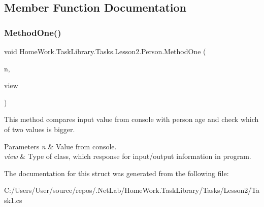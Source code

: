 \subsection{Member Function Documentation}
\mbox{\label{struct_home_work_1_1_task_library_1_1_tasks_1_1_lesson2_1_1_person_ab836c6c8d008fc2ef5a5ff5e3f715fae}} 
\subsubsection{\texorpdfstring{MethodOne()}{MethodOne()}}
{\footnotesize\ttfamily void Home\+Work.\+Task\+Library.\+Tasks.\+Lesson2.\+Person.\+Method\+One (\begin{DoxyParamCaption}\item[{int}]{n,  }\item[{I\+Information}]{view }\end{DoxyParamCaption})}



This method compares input value from console with person age and check which of two values is bigger. 


\begin{DoxyParams}{Parameters}
{\em n} & Value from console.\\
\hline
{\em view} & Type of class, which response for input/output information in program.\\
\hline
\end{DoxyParams}


The documentation for this struct was generated from the following file\+:\begin{DoxyCompactItemize}
\item 
C\+:/\+Users/\+User/source/repos/.\+Net\+Lab/\+Home\+Work.\+Task\+Library/\+Tasks/\+Lesson2/Task1.\+cs\end{DoxyCompactItemize}
